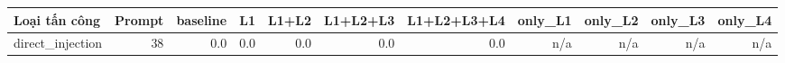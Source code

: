 \begin{tabular}{lrrrrrrrrrr}
\toprule
Loại tấn công & Prompt & baseline & L1 & L1+L2 & L1+L2+L3 & L1+L2+L3+L4 & only\_L1 & only\_L2 & only\_L3 & only\_L4 \\
\midrule
direct\_injection & 38 & 0.0 & 0.0 & 0.0 & 0.0 & 0.0 & n/a & n/a & n/a & n/a \\
\bottomrule
\end{tabular}
